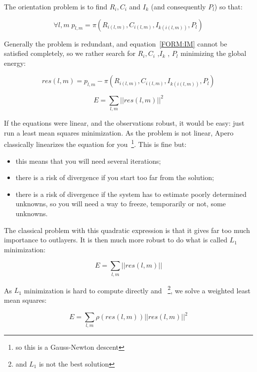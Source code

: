 The orientation problem is to find $R_i,C_i$ and $I_k$ (and consequently $P_l$)
so that:

\begin{equation}
     \forall l,m \;   p_{l,m} =  \pi(R_{i(l,m)},C_{i(l,m)},I_{k(i(l,m))},P_l) \label{FORM:IM}
\end{equation}

Generally the problem is redundant, and  equation~\ref{FORM:IM} cannot
be satisfied completely, so we rather search for  $R_i,C_i$ ,$I_k$ , $P_l$
minimizing the global energy:

\begin{equation}
        res(l,m) =  p_{l,m} -  \pi(R_{i(l,m)},C_{i(l,m)},I_{k(i(l,m))},P_l) \label{FORM:EL2}
\end{equation}

\begin{equation}
      E = \sum_{l,m}  || res(l,m)||^2 \label{FORM:EL2}
\end{equation}

If the equations were linear, and the observations robust, it would be easy:
just run a least mean squares minimization. As the problem is not linear,
Apero classically linearizes the equation for you~\footnote{so this is a Gauss-Newton descent}.
 This is fine but:

\begin{itemize}
   \item  this means  that you will need several iterations;
   \item  there is a risk of divergence if you start too far from the solution;
   \item  there is a risk of divergence if the system has to estimate poorly determined unknowns,
          so you will need a way to freeze, temporarily or not, some unknowns.
\end{itemize}

The classical problem with this quadratic expression is that it gives far too much
importance to outlayers. It is then much more robust to do what is called
$L_1$ minimization:

\begin{equation}
      E = \sum_{l,m}  || res(l,m) || \label{FORM:EL1}
\end{equation}

As $L_1$ minimization is hard to compute directly and ~\footnote{and $L_1$
is not the best solution}, we solve a weighted least mean squares:

\begin{equation}
      E = \sum_{l,m}  \rho(res(l,m)) || res(l,m) ||^2  \label{FORM:ELP}
\end{equation}

